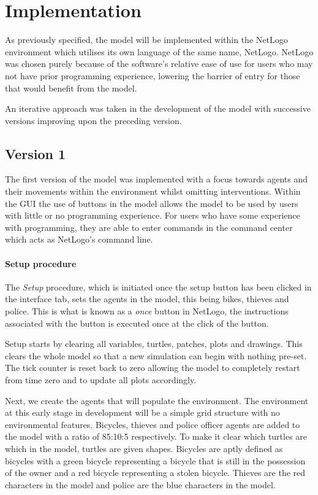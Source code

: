 \documentclass[11pt]{informatics-report}
\begin{document}
\chapter{Implementation}
As previously specified, the model will be implemented within the NetLogo environment which utilises its own language of the same name, NetLogo. NetLogo was chosen purely because of the software's relative ease of use for users who may not have prior programming experience, lowering the barrier of entry for those that would benefit from the model.  \par

An iterative approach was taken in the development of the model with successive versions improving upon the preceding version.

\section{Version 1}
The first version of the model was implemented with a focus towards agents and their movements within the environment whilst omitting interventions. Within the GUI the use of buttons in the model allows the model to be used by users with little or no programming experience. For users who have some experience with programming, they are able to enter commands in the command center which acts as NetLogo's command line. \par

\subsubsection{Setup procedure}
The \textit{Setup} procedure, which is initiated once the setup button has been clicked in the interface tab, sets the agents in the model, this being bikes, thieves and police. This is what is known as a \emph{once} button in NetLogo, the instructions associated with the button is executed once at the click of the button.\par

Setup starts by clearing all variables, turtles, patches, plots and drawings. This clears the whole model so that a new simulation can begin with nothing pre-set. The tick counter is reset back to zero allowing the model to completely restart from time zero and to update all plots accordingly. \par

Next, we create the agents that will populate the environment. The environment at this early stage in development will be a simple grid structure with no environmental features. Bicycles, thieves and police officer agents are added to the model with a ratio of 85:10:5 respectively. To make it clear which turtles are which in the model, turtles are given shapes. Bicycles are aptly defined as bicycles with a green bicycle representing a bicycle that is still in the possession of the owner and a red bicycle representing a stolen bicycle. Thieves are the red characters in the model and police are the blue characters in the model. \par
\end{document}
